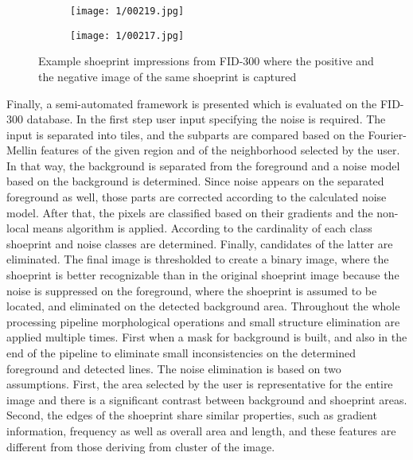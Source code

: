 \documentclass[draft,final]{vutinfth} %
\begin{document}
\begin{figure}[H]
  \centering
  \begin{subfigure}[t]{0.38\columnwidth}
    \centering
    \texttt{[image: 1/00219.jpg]}
	\caption{}
	\label{fig:int:cap:pos}
  \end{subfigure}
  \begin{subfigure}[t]{0.38\columnwidth}
    \centering
    \texttt{[image: 1/00217.jpg]}
	\caption{}
	\label{fig:int:cap:neg}
  \end{subfigure}
  \caption{Example shoeprint impressions from FID-300 where the positive  and the negative  image of the same shoeprint is captured}
  \label{fig:int:cap}
\end{figure}

\par
Finally, a semi-automated framework is presented which is evaluated on the FID-300 database.
In the first step user input specifying the noise is required.
The input is separated into tiles, and the subparts are compared based on the Fourier-Mellin features of the given region and of the neighborhood selected by the user.
In that way, the background is separated from the foreground and a noise model based on the background is determined.
Since noise appears on the separated foreground as well, those parts are corrected according to the calculated noise model.
After that, the pixels are classified based on their gradients and the non-local means algorithm is applied.
According to the cardinality of each class shoeprint and noise classes are determined.
Finally, candidates of the latter are eliminated.
The final image is thresholded to create a binary image, where the shoeprint is better recognizable than in the original shoeprint image because the noise is suppressed on the foreground, where the shoeprint is assumed to be located, and eliminated on the detected background area.
Throughout the whole processing pipeline morphological operations and small structure elimination are applied multiple times. 
First when a mask for background is built, and also in the end of the pipeline to eliminate small inconsistencies on the determined foreground and detected lines. 
The noise elimination is based on two assumptions.
First, the area selected by the user is representative for the entire image and there is a significant contrast between background and shoeprint areas.
Second, the edges of the shoeprint share similar properties, such as gradient information, frequency as well as overall area and length, and these features are different from those deriving from cluster of the image.
\end{document}
